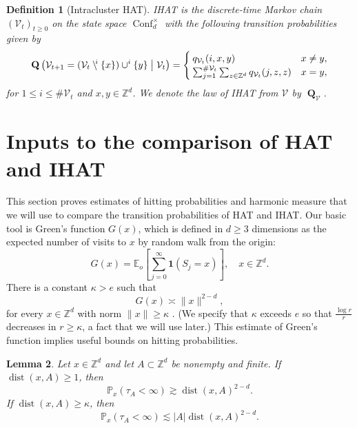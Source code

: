 \documentclass[11pt,reqno]{amsart}
\newtheorem{lemma}{Lemma}[section]
\newtheorem{definition}[lemma]{Definition}
\theoremstyle{definition}
\numberwithin{equation}{section}
\newcommand{\Z}{\mathbb{Z}}
\renewcommand{\P}{\mathbb{P}}
\newcommand{\E}{\mathbb{E}}
\newcommand{\1}{\mathbf{1}}
\DeclareMathOperator{\dist}{dist}
\DeclareMathOperator{\QQ}{\mathbf{Q}}
\newcommand{\sd}[1]{\setminus^{\hspace{-0.2em} #1}}
\newcommand{\VV}{\mathcal{V}}
\DeclareMathOperator{\Conf}{\mathrm{Conf}}
\begin{document}
\begin{definition}[Intracluster HAT] 
IHAT is the discrete-time Markov chain $(\VV_t)_{t \geq 0}$ on the state space $\Conf_d^\times$ with the following transition probabilities given by 
\begin{equation}\label{eq tps pprod}
\QQ \left( \VV_{t+1} = (\VV_t \sd{i} \{x\}) \cup^i \{y\} \bigm\vert \VV_t \right) = 
\begin{cases}
q_{\VV_t} (i,x,y) & x \neq y,\\ 
\sum_{j=1}^{\# \VV_t} \sum_{z \in \Z^d} q_{\VV_t} (j,z,z) & x = y,
\end{cases}
\end{equation}
for $1 \leq i \leq \# \VV_t$ and $x,y \in \Z^d$. We denote the law of IHAT from $\VV$ by $\QQ_\VV$.
\end{definition}




\section{Inputs to the comparison of HAT and IHAT}\label{hm bd}

This section proves estimates of hitting probabilities and harmonic measure that we will use to compare the transition probabilities of HAT and IHAT. 
Our basic tool is Green's function $G(x)$, which is defined in $d \geq 3$ dimensions as the expected number of visits to $x$ by random walk from the origin: 
\begin{equation}\label{eq green}
G(x) = \E_o \left[ \sum_{j=0}^\infty \1 (S_j = x) \right], \quad x \in \Z^d.
\end{equation}
There is a constant $\kappa > e$ such that
\begin{equation}\label{eq green asymp}
G(x) \asymp \|x\|^{2-d},
\end{equation}
for every $x \in \Z^d$ with norm $\|x\| \geq \kappa$ \cite[Theorem 4.3.1]{lawler2010random}. (We specify that $\kappa$ exceeds $e$ so that $\frac{\log r}{r}$ decreases in $r \geq \kappa$, a fact that we will use later.) This estimate of Green's function implies useful bounds on hitting probabilities.

\begin{lemma}\label{simple set hit}
Let $x \in \Z^d$ and let $A \subset \Z^d$ be nonempty and finite. If $\dist (x,A) \geq 1$, then
\begin{equation}\label{eq simple set hit lb}
\P_x (\tau_A < \infty) \gtrsim \dist (x, A)^{2-d}.
\end{equation}
If $\dist (x, A) \geq \kappa$, then
\begin{equation}\label{eq simple set hit ub}
\P_x (\tau_A < \infty) \lesssim |A| \dist (x,A)^{2-d}.
\end{equation}
\end{lemma} 
\end{document}
